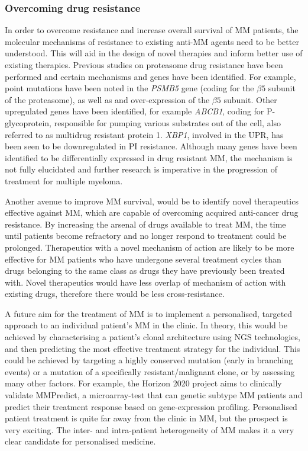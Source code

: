 \subsubsection{Overcoming drug resistance}
In order to overcome resistance and increase overall survival of MM patients, the molecular mechanisms of resistance to existing anti-MM agents need to be better understood.
This  will aid in the design of novel therapies and inform better use of existing therapies.
Previous studies on proteasome drug resistance have been performed and certain mechanisms and genes have been identified.
For example, point mutations have been noted in the \textit{PSMB5} gene (coding for the $\beta5$ subunit of the proteasome), as well as and over-expression of the $\beta5$ subunit\cite{robak2018drug}.
Other upregulated genes have been identified, for example \textit{ABCB1}, coding for P-glycoprotein, responsible for pumping various substrates out of the cell, also referred to as multidrug resistant protein 1.
\textit{XBP1}, involved in the UPR, has been seen to be downregulated in PI resistance\cite{robak2018drug}.
Although many genes have been identified to be differentially expressed in drug resistant MM, the mechanism is not fully elucidated and further research is imperative in the progression of treatment for multiple myeloma.

Another avenue to improve MM survival, would be to identify novel therapeutics effective against MM, which are capable of overcoming acquired
anti-cancer drug resistance.
By increasing the arsenal of drugs available to treat MM, the time until patients become refractory and no longer respond to treatment could be prolonged.
Therapeutics with a novel mechanism of action are likely to be more effective for MM patients who have undergone several treatment cycles than drugs belonging to the same class as drugs they have previously been treated with.
Novel therapeutics would have less overlap of mechanism of action with existing drugs, therefore there would be less cross-resistance.

A future aim for the treatment of MM is to implement a personalised, targeted approach to an individual patient's MM in the clinic.
In theory, this would be achieved by characterising a patient's clonal architecture using NGS technologies, and then predicting the most effective treatment strategy for the individual.
This could be achieved by targeting a highly conserved mutation (early in branching events) or a mutation of a specifically resistant/malignant clone, or by assessing many other factors.
For example, the Horizon 2020 project aims to clinically validate MMPredict, a microarray-test that can genetic subtype MM patients and predict their treatment response based on gene-expression profiling\cite{horizon2020}.
Personalised patient treatment is quite far away from the clinic in MM, but the prospect is very exciting.
The inter- and intra-patient heterogeneity of MM makes it a very clear candidate for personalised medicine.

